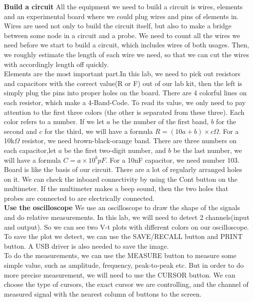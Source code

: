 \textbf{Build a circuit} \newline
\phantom{ } All the equipment we need to build a circuit is wires, elements and an experimental board where we could plug wires and pins of elements in.\\
\phantom{ } Wires are used not only to build the circuit itself, but also to make a bridge between some node in a circuit and a probe. We need to count all the wires we need before we start to build a circuit, which includes wires of both usages. Then, we roughly estimate the length of each wire we need, so that we can cut the wires with accordingly length off quickly.\\
\phantom{ } Elements are the most important part.In this lab, we need to pick out resistors and capacitors with the correct value(R or F) out of our lab kit, then the left is simply plug the pins into proper holes on the board. There are 4 colorful lines on each resistor, which make a 4-Band-Code. To read its value, we only need to pay attention to the first three colors (the other is separated from these three). Each color refers to a number. If we let $a$ be the number of the first band, $b$ for the second and $c$ for the third, we will have a formula $R = (10a+b)\times c\Omega$. For a 10k$\Omega$ resistor, we need brown-black-orange band. There are three numbers on each capacitor,let $a$ be the first two-digit number, and $b$ be the last number, we will have a formula $C = a \times 10^b pF$. For a 10nF capacitor, we need number 103.\\
\phantom{ } Board is like the basis of our circuit. There are a lot of regularly arranged holes on it. We can check the inboard connectivity by using the Cont button on the multimeter. If the multimeter makes a beep sound, then the two holes that probes are connected to are electrically connected.\\
\textbf{Use the oscilloscope} \newline
\phantom{ } We use an oscilloscope to draw the shape of the signals and do relative measurements. In this lab, we will need to detect 2 channels(input and output). So we can see two V-t plots with different colors on our oscilloscope. To save the plot we detect, we can use the SAVE/RECALL button and PRINT button. A USB driver is also needed to save the image.\\
\phantom{ } To do the measurements, we can use the MEASURE button to measure some simple value, such as amplitude, frequency, peak-to-peak etc. But in order to do more precise measurement, we will need to use the CURSOR button. We can choose the type of cursors, the exact cursor we are controlling, and the channel of measured signal with the nearest column of buttons to the screen.\\
